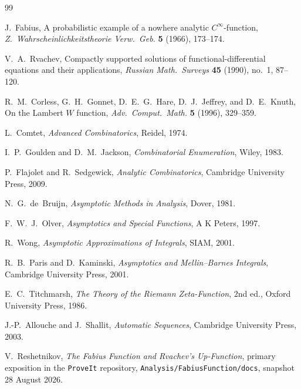 \documentclass[11pt,oneside]{article}
\numberwithin{equation}{section}
\theoremstyle{definition}
\theoremstyle{remark}
\newcommand{\repo}{\nolinkurl{Analysis/FabiusFunction/docs}}
\begin{document}
\begin{thebibliography}{99}

J.~Fabius,
\newblock A probabilistic example of a nowhere analytic
$C^\infty$-function,
\newblock \emph{Z.\ Wahrscheinlichkeitstheorie Verw.\ Geb.}
\textbf{5} (1966), 173--174.

V.~A.~Rvachev,
\newblock Compactly supported solutions of functional-differential
equations and their applications,
\newblock \emph{Russian Math.\ Surveys} \textbf{45} (1990), no.~1,
87--120.

R.~M.~Corless, G.~H.~Gonnet, D.~E.~G.~Hare, D.~J.~Jeffrey, and
D.~E.~Knuth,
\newblock On the Lambert $W$ function,
\newblock \emph{Adv.\ Comput.\ Math.} \textbf{5} (1996), 329--359.

L.~Comtet,
\newblock \emph{Advanced Combinatorics},
\newblock Reidel, 1974.

I.~P.~Goulden and D.~M.~Jackson,
\newblock \emph{Combinatorial Enumeration},
\newblock Wiley, 1983.

P.~Flajolet and R.~Sedgewick,
\newblock \emph{Analytic Combinatorics},
\newblock Cambridge University Press, 2009.

N.~G.~de~Bruijn,
\newblock \emph{Asymptotic Methods in Analysis},
\newblock Dover, 1981.

F.~W.~J.~Olver,
\newblock \emph{Asymptotics and Special Functions},
\newblock A K Peters, 1997.

R.~Wong,
\newblock \emph{Asymptotic Approximations of Integrals},
\newblock SIAM, 2001.

R.~B.~Paris and D.~Kaminski,
\newblock \emph{Asymptotics and Mellin--Barnes Integrals},
\newblock Cambridge University Press, 2001.

E.~C.~Titchmarsh,
\newblock \emph{The Theory of the Riemann Zeta-Function}, 2nd ed.,
\newblock Oxford University Press, 1986.

J.-P.~Allouche and J.~Shallit,
\newblock \emph{Automatic Sequences},
\newblock Cambridge University Press, 2003.

V.~Reshetnikov,
\newblock \emph{The Fabius Function and Rvachev's Up-Function},
\newblock primary exposition in the \texttt{ProveIt} repository,
\repo, snapshot 28 August 2026.


\end{thebibliography}
\end{document}
